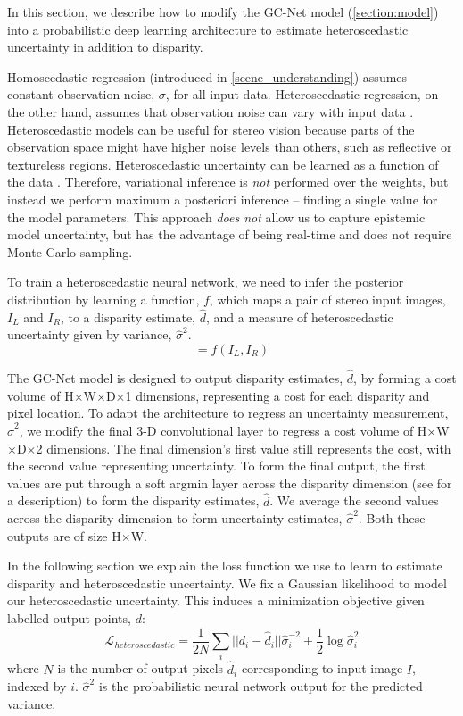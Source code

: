 In this section, we describe how to modify the GC-Net model (\cref{section:model}) into a probabilistic deep learning architecture to estimate heteroscedastic uncertainty in addition to disparity.

Homoscedastic regression (introduced in \cref{scene_understanding}) assumes constant observation noise, $\sigma$, for all input data. Heteroscedastic regression, on the other hand, assumes that observation noise can vary with input data \citep{nix1994estimating,le2005heteroscedastic}. Heteroscedastic models can be useful for stereo vision because parts of the observation space might have higher noise levels than others, such as reflective or textureless regions. Heteroscedastic uncertainty can be learned as a function of the data \citep{kendall2017uncertainties}. Therefore, variational inference is \textit{not} performed over the weights, but instead we perform maximum a posteriori inference -- finding a single value for the model parameters. This approach \textit{does not} allow us to capture epistemic model uncertainty, but has the advantage of being real-time and does not require Monte Carlo sampling.

To train a heteroscedastic neural network, we need to infer the posterior distribution by learning a function, $f$, which maps a pair of stereo input images, $I_{L}$ and $I_{R}$, to a disparity estimate, $\hat{d}$, and a measure of heteroscedastic uncertainty given by variance, $\hat{\sigma}^2$. 
\begin{equation}
[\hat{d}, \hat{\sigma}^2] = f(I_{L}, I_{R})
\end{equation}

The GC-Net model is designed to output disparity estimates, $\hat{d}$, by forming a cost volume of H$\times$W$\times$D$\times$1 dimensions, representing a cost for each disparity and pixel location. To adapt the architecture to regress an uncertainty measurement, $\hat{\sigma}^2$, we modify the final 3-D convolutional layer to regress a cost volume of H$\times$W$\times$D$\times$2 dimensions. The final dimension's first value still represents the cost, with the second value representing uncertainty. To form the final output, the first values are put through a soft argmin layer across the disparity dimension (see \citep{kendall2017end} for a description) to form the disparity estimates, $\hat{d}$. We average the second values across the disparity dimension to form uncertainty estimates, $\hat{\sigma}^2$. Both these outputs are of size H$\times$W.

In the following section we explain the loss function we use to learn to estimate disparity and heteroscedastic uncertainty. We fix a Gaussian likelihood to model our heteroscedastic uncertainty. This induces a minimization objective \citep{nix1994estimating} given labelled output points, $d$:
\begin{equation}
\mathcal{L}_{heteroscedastic} = \frac{1}{2N} \sum_i ||d_i-\hat{d}_i||\hat{\sigma}^{-2}_i + \frac{1}{2}\log{\hat{\sigma}^2_i}
\label{eqn:bayes_loss}
\end{equation}
where $N$ is the number of output pixels $\hat{d}_i$ corresponding to input image $I$, indexed by $i$. $\hat{\sigma}^2$ is the probabilistic neural network output for the predicted variance.

